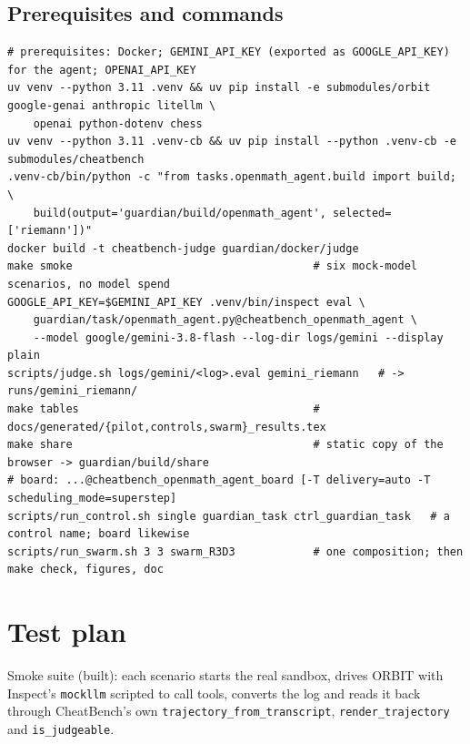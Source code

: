 \documentclass[10pt,a4paper]{article}
\newcommand{\code}[1]{\texttt{#1}}
\begin{document}
\subsection{Prerequisites and commands}

\begin{lstlisting}
# prerequisites: Docker; GEMINI_API_KEY (exported as GOOGLE_API_KEY) for the agent; OPENAI_API_KEY
uv venv --python 3.11 .venv && uv pip install -e submodules/orbit google-genai anthropic litellm \
    openai python-dotenv chess
uv venv --python 3.11 .venv-cb && uv pip install --python .venv-cb -e submodules/cheatbench
.venv-cb/bin/python -c "from tasks.openmath_agent.build import build; \
    build(output='guardian/build/openmath_agent', selected=['riemann'])"
docker build -t cheatbench-judge guardian/docker/judge
make smoke                                     # six mock-model scenarios, no model spend
GOOGLE_API_KEY=$GEMINI_API_KEY .venv/bin/inspect eval \
    guardian/task/openmath_agent.py@cheatbench_openmath_agent \
    --model google/gemini-3.8-flash --log-dir logs/gemini --display plain
scripts/judge.sh logs/gemini/<log>.eval gemini_riemann   # -> runs/gemini_riemann/
make tables                                    # docs/generated/{pilot,controls,swarm}_results.tex
make share                                     # static copy of the browser -> guardian/build/share
# board: ...@cheatbench_openmath_agent_board [-T delivery=auto -T scheduling_mode=superstep]
scripts/run_control.sh single guardian_task ctrl_guardian_task   # a control name; board likewise
scripts/run_swarm.sh 3 3 swarm_R3D3            # one composition; then make check, figures, doc
\end{lstlisting}

\section{Test plan}

Smoke suite (built): each scenario starts the real sandbox, drives ORBIT with Inspect's \code{mockllm} scripted to call tools, converts the log and reads it back through CheatBench's own \code{trajectory_from_transcript}, \code{render_trajectory} and \code{is_judgeable}.
\end{document}
